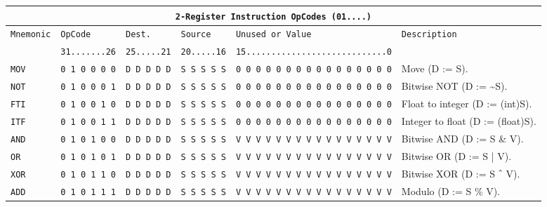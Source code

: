 \documentclass[a5paper]{report}
\begin{document}
{\footnotesize
\begin{center}
\begin{tabular}[ht]{
	| p{} | p{} | p{} | p{}
	| p{} | p{} |
}
	\hline
	\multicolumn{6}{|c|}{\texttt{2-Register Instruction OpCodes (01....)}} \\
	\hline \hline
	
	\multirow{2}{*}{\texttt{Mnemonic}} & \texttt{OpCode} & \texttt{Dest.} & \texttt{Source} &
		\texttt{Unused or Value} & \multirow{2}{*}{\texttt{Description}} \\
	& \texttt{31.......26} & \texttt{25.....21} & \texttt{20.....16} & \texttt{15............................0} & \\
	\hline
	
	\texttt{MOV} & \texttt{0 1 0 0 0 0} & \texttt{D D D D D} & \texttt{S S S S S} &
		\texttt{0 0 0 0 0 0 0 0 0 0 0 0 0 0 0 0} & Move (D := S). \\
	\hline
	
	\texttt{NOT} & \texttt{0 1 0 0 0 1} & \texttt{D D D D D} & \texttt{S S S S S} &
		\texttt{0 0 0 0 0 0 0 0 0 0 0 0 0 0 0 0} & Bitwise NOT (D := \textasciitilde S). \\
	\hline
	
	\texttt{FTI} & \texttt{0 1 0 0 1 0} & \texttt{D D D D D} & \texttt{S S S S S} &
		\texttt{0 0 0 0 0 0 0 0 0 0 0 0 0 0 0 0} & Float to integer (D := (int)S). \\
	\hline
	
	\texttt{ITF} & \texttt{0 1 0 0 1 1} & \texttt{D D D D D} & \texttt{S S S S S} &
		\texttt{0 0 0 0 0 0 0 0 0 0 0 0 0 0 0 0} & Integer to float (D := (float)S). \\
	\hline
	
	\texttt{AND} & \texttt{0 1 0 1 0 0} & \texttt{D D D D D} & \texttt{S S S S S} &
		\texttt{V V V V V V V V V V V V V V V V} & Bitwise AND (D := S \& V). \\
	\hline
	
	\texttt{OR} & \texttt{0 1 0 1 0 1} & \texttt{D D D D D} & \texttt{S S S S S} &
		\texttt{V V V V V V V V V V V V V V V V} & Bitwise OR (D := S | V). \\
	\hline
	
	\texttt{XOR} & \texttt{0 1 0 1 1 0} & \texttt{D D D D D} & \texttt{S S S S S} &
		\texttt{V V V V V V V V V V V V V V V V} & Bitwise XOR (D := S ${\mathchar"5E}$ V). \\
	\hline
	
	\texttt{ADD} & \texttt{0 1 0 1 1 1} & \texttt{D D D D D} & \texttt{S S S S S} &
		\texttt{V V V V V V V V V V V V V V V V} & Modulo (D := S \% V). \\
	\hline
	

\end{tabular}
\end{center}}
\end{document}
